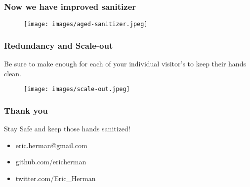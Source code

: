 \documentclass{beamer}
\begin{document}
\begin{frame}
\frametitle{Now we have improved sanitizer}
\begin{figure}
\texttt{[image: images/aged-sanitizer.jpeg]}
\end{figure}
\end{frame}


\begin{frame}
\frametitle{Redundancy and Scale-out}
Be sure to make enough for each of your individual visitor's to keep
their hands clean.
\begin{figure}
\texttt{[image: images/scale-out.jpeg]}
\end{figure}
\end{frame}

\begin{frame}
\frametitle{Thank you}
\huge{Stay Safe and keep those hands sanitized!}\newline
\begin{itemize}
\item eric.herman@gmail.com
\item github.com/ericherman
\item twitter.com/Eric\_Herman
\end{itemize}
\end{frame}
\end{document}
